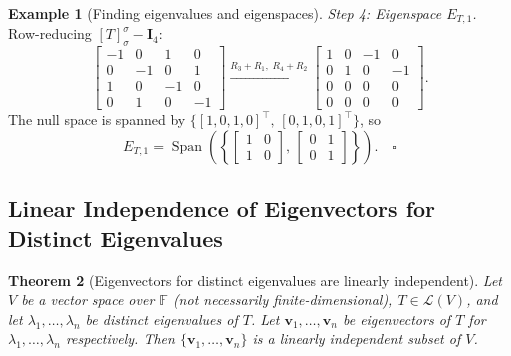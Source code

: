\documentclass[11pt, a4paper, notitlepage]{report}
\newtheorem{theorem}{Theorem}[section]
\theoremstyle{definition}
\newtheorem{example}[theorem]{Example}
\theoremstyle{remark}
\begin{document}
\begin{example}[Finding eigenvalues and eigenspaces]
\emph{Step 4: Eigenspace $E_{T,1}$.} Row-reducing $[T]_\sigma^\sigma - \mathbf{I}_4$:
\[
  \begin{bmatrix}-1&0&1&0\\0&-1&0&1\\1&0&-1&0\\0&1&0&-1\end{bmatrix}
  \xrightarrow{R_3+R_1,\;R_4+R_2}
  \begin{bmatrix}1&0&-1&0\\0&1&0&-1\\0&0&0&0\\0&0&0&0\end{bmatrix}.
\]
The null space is spanned by $\bigl\{[1,0,1,0]^\top,\,[0,1,0,1]^\top\bigr\}$, so
\[
  E_{T,1} = \operatorname{Span}\!\left(\left\{\begin{bmatrix}1&0\\1&0\end{bmatrix},\,
  \begin{bmatrix}0&1\\0&1\end{bmatrix}\right\}\right). \quad\square
\]
\end{example}

\subsection{Linear Independence of Eigenvectors for Distinct Eigenvalues}

\begin{theorem}[Eigenvectors for distinct eigenvalues are linearly independent]\label{thm:eigenvectors-lin-indep}
Let $V$ be a vector space over $\mathbb{F}$ (not necessarily finite-dimensional),
$T \in \mathcal{L}(V)$, and let $\lambda_1, \ldots, \lambda_n$ be \emph{distinct}
eigenvalues of $T$. Let $\mathbf{v}_1, \ldots, \mathbf{v}_n$ be eigenvectors of $T$ for
$\lambda_1, \ldots, \lambda_n$ respectively. Then $\{\mathbf{v}_1, \ldots, \mathbf{v}_n\}$
is a linearly independent subset of $V$.
\end{theorem}
\end{document}
